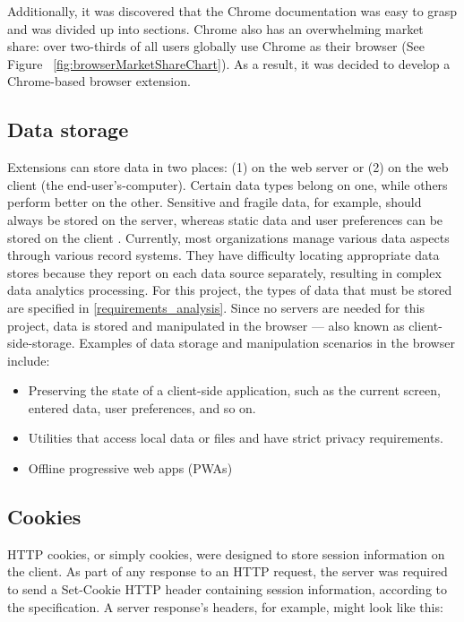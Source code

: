 Additionally, it was discovered that the Chrome documentation was easy to grasp and was divided up into sections. Chrome also has an overwhelming market share: over two-thirds of all users globally use Chrome as their browser (See Figure ~\ref{fig:browserMarketShareChart}). As a result, it was decided to develop a Chrome-based browser extension.

\subsection{Data storage}
Extensions can store data in two places: (1) on the web server or (2) on the web client (the end-user's-computer). Certain data types belong on one, while others perform better on the other. Sensitive and fragile data, for example, should always be stored on the server, whereas static data and user preferences can be stored on the client \autocite{macdonald2013html5}. Currently, most organizations manage various data aspects through various record systems. They have difficulty locating appropriate data stores because they report on each data source separately, resulting in complex data analytics processing. For this project, the types of data that must be stored are specified in \autoref{requirements_analysis}. Since no servers are needed for this project, data is stored and manipulated in the browser --- also known as client-side-storage. Examples of data storage and manipulation scenarios in the browser include:

\begin{itemize}
  \item Preserving the state of a client-side application, such as the current screen, entered data, user preferences, and so on.
  \item Utilities that access local data or files and have strict privacy requirements.
  \item Offline progressive web apps (PWAs)
\end{itemize}

\subsection*{Cookies}
HTTP cookies, or simply cookies, were designed to store session information on the client. As part of any response to an HTTP request, the server was required to send a Set-Cookie HTTP header containing session information, according to the specification. A server response's headers, for example, might look like this:

